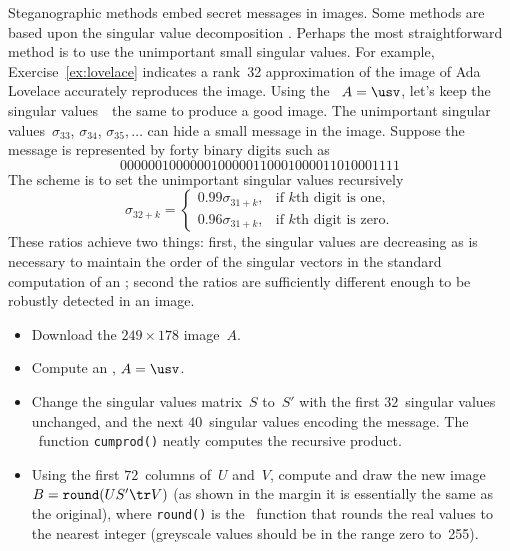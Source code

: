 \begin{exercise} \label{ex:} 
 Steganographic methods embed secret messages in images.
Some methods are based upon the singular value decomposition \cite[e.g.]{Gorodetski2001}. %
Perhaps the most straightforward method is to use the unimportant small singular values.
For example, Exercise~\ref{ex:lovelace} indicates a rank~32 approximation of the image of Ada Lovelace accurately reproduces the image.
Using the \svd\ \(A=\usv\), let's keep the singular values~\hlist{}\ the same to produce a good image.
The unimportant singular values~\(\sigma_{33}\), \(\sigma_{34}\), \(\sigma_{35},\ldots\) can hide a small message in the image.
Suppose the message is represented by forty binary digits such as
\begin{equation*}
0000001000000100000110001000011010001111
\end{equation*}
The scheme is to set the unimportant singular values recursively
\begin{equation*}
\sigma_{32+k}=\begin{cases}0.99\sigma_{31+k},
&\text{if \(k\)th digit is one},
\\0.96\sigma_{31+k},
&\text{if \(k\)th digit is zero}.
\end{cases}
\end{equation*}
These ratios achieve two things: first, the singular values are decreasing as is necessary to maintain the order of the singular vectors in the standard computation of an \svd; second the ratios are sufficiently different enough to be robustly detected in an image.
\begin{itemize}
\item Download the \(249\times178\) image~\(A\).

\item Compute an \svd, \(A=\usv\).

\item Change the singular values matrix~\(S\) to~\(S'\) with the first \(32\)~singular values unchanged, and the next \(40\)~singular values encoding the message.
The \script\ function \verb|cumprod()| neatly computes the recursive product.

\item Using the first \(72\)~columns of~\(U\) and~\(V\), compute and draw the new image \(B=\verb|round|(US'\tr V)\) (as shown in the margin it is essentially the same as the original),
%
where \verb|round()| is the \script\ function that rounds the real values to the nearest integer (greyscale values should be in the range zero to~255). 


\end{itemize}
\end{exercise}
